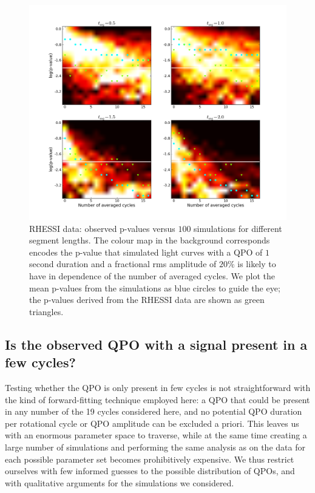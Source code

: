 \documentclass{emulateapj}
\begin{document}
\begin{figure}[htbp]
\begin{center}
\includegraphics[width=\textwidth]{1806_rhessi_1ssignal_randomphase_pvalues.png}
\caption{RHESSI data: observed p-values versus $100$ simulations for different segment lengths. The colour map in the background corresponds encodes the p-value that simulated light curves with a QPO of $1$ second duration and a fractional rms amplitude of $20\%$ is likely to have in dependence of the number of averaged cycles. We plot the mean p-values from the simulations as blue circles to guide the eye; the p-values derived from the RHESSI data are shown as green triangles.}
\label{fig:rhessi_sims2_pvalues}
\end{center}
\end{figure}


\subsection{Is the observed QPO with a signal present in a few cycles?}

Testing whether the QPO is only present in few cycles is not straightforward with the kind of forward-fitting technique employed here: a QPO that could be present in any number of the 19 cycles considered here, and no potential QPO duration per rotational cycle or QPO amplitude can be excluded a priori. This leaves us with an enormous parameter space to traverse, while at the same time creating a large number of simulations and performing the same analysis as on the data for each possible parameter set becomes prohibitively expensive. We thus restrict ourselves with few informed guesses to the possible distribution of QPOs, and with qualitative arguments for the simulations we considered. 
\end{document}
